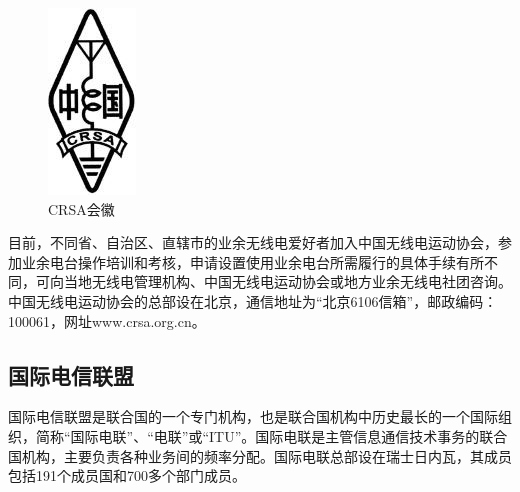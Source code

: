 \documentclass[12pt,UTF8]{ctexbook}
\begin{document}
\begin{figure}[htbp]
	\centering
	\includegraphics[width=0.7\linewidth]{15}
	\caption{CRSA会徽}
	\label{fig:1}
\end{figure}

目前，不同省、自治区、直辖市的业余无线电爱好者加入中国无线电运动协会，参加业余电台操作培训和考核，申请设置使用业余电台所需履行的具体手续有所不同，可向当地无线电管理机构、中国无线电运动协会或地方业余无线电社团咨询。中国无线电运动协会的总部设在北京，通信地址为“北京6106信箱”，邮政编码：100061，网址www.crsa.org.cn。

\subsection{国际电信联盟}

国际电信联盟是联合国的一个专门机构，也是联合国机构中历史最长的一个国际组织，简称“国际电联”、“电联”或“ITU”。国际电联是主管信息通信技术事务的联合国机构，主要负责各种业务间的频率分配。国际电联总部设在瑞士日内瓦，其成员包括191个成员国和700多个部门成员。
\end{document}
